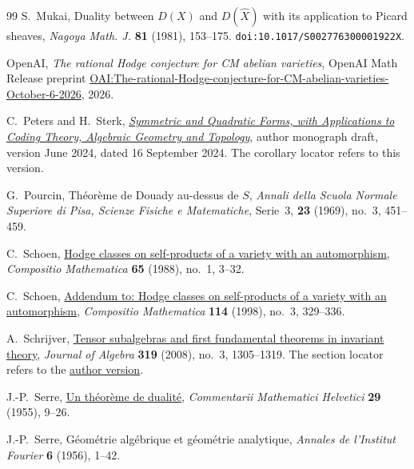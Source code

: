 \documentclass[11pt]{article}
\numberwithin{equation}{section}
\begin{document}
\begin{thebibliography}{99}
S.~Mukai,
Duality between \(D(X)\) and \(D(\widehat X)\) with its application to Picard sheaves,
\emph{Nagoya Math. J.} \textbf{81} (1981), 153--175.
\texttt{doi:10.1017/S002776300001922X}.

OpenAI,
\emph{The rational Hodge conjecture for CM abelian varieties},
OpenAI Math Release preprint
\href{https://github.com/openai/math/blob/main/preprints/The-rational-Hodge-conjecture-for-CM-abelian-varieties-October-6-2026/paper.pdf}{OAI:The-rational-Hodge-conjecture-for-CM-abelian-varieties-October-6-2026},
2026.

C.~Peters and H.~Sterk,
\href{https://www-fourier.univ-grenoble-alpes.fr/~peters/Books/QuadraticForms/QuadForms.pdf}{\emph{Symmetric and Quadratic Forms, with Applications to Coding Theory, Algebraic Geometry and Topology}},
author monograph draft, version June 2024, dated 16 September 2024.
The corollary locator refers to this version.

G.~Pourcin,
Th\'eor\`eme de Douady au-dessus de \(S\),
\emph{Annali della Scuola Normale Superiore di Pisa, Scienze Fisiche e Matematiche},
Serie~3, \textbf{23} (1969), no.~3, 451--459.

C.~Schoen,
\href{https://www.numdam.org/item/CM_1988__65_1_3_0/}{Hodge classes on self-products of a variety with an automorphism},
\emph{Compositio Mathematica} \textbf{65} (1988), no.~1, 3--32.

C.~Schoen,
\href{https://doi.org/10.1023/A:1000566205021}{Addendum to: Hodge classes on self-products of a variety with an automorphism},
\emph{Compositio Mathematica} \textbf{114} (1998), no.~3, 329--336.

A.~Schrijver,
\href{https://doi.org/10.1016/j.jalgebra.2007.10.039}{Tensor subalgebras and first fundamental theorems in invariant theory},
\emph{Journal of Algebra} \textbf{319} (2008), no.~3, 1305--1319.
The section locator refers to the
\href{https://homepages.cwi.nl/~lex/files/tensfft_ja.pdf}{author version}.

J.-P.~Serre,
\href{https://doi.org/10.5169/seals-23275}{Un th\'eor\`eme de dualit\'e},
\emph{Commentarii Mathematici Helvetici}
\textbf{29} (1955), 9--26.

J.-P.~Serre,
G\'eom\'etrie alg\'ebrique et g\'eom\'etrie analytique,
\emph{Annales de l'Institut Fourier} \textbf{6} (1956), 1--42.


\end{thebibliography}
\end{document}
